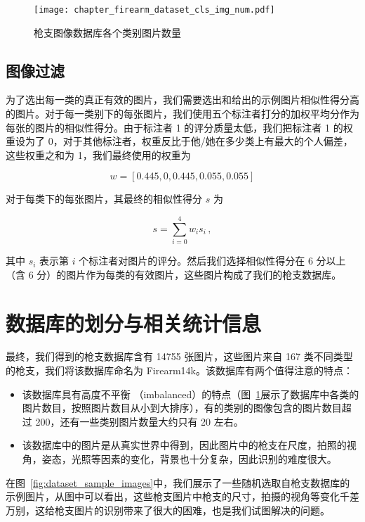 \begin{figure}[t]
	\centering
	\texttt{[image: chapter\_firearm\_dataset\_cls\_img\_num.pdf]}
	\caption{枪支图像数据库各个类别图片数量}
	\label{fig:dataset_cls_img_num}
\end{figure}

\subsection{图像过滤}
为了选出每一类的真正有效的图片，我们需要选出和给出的示例图片相似性得分高的图片。对于每一类别下的每张图片，我们使用五个标注者打分的加权平均分作为每张的图片的相似性得分。由于标注者 1 的评分质量太低，我们把标注者 1 的权重设为了 0，对于其他标注者，权重反比于他/她在多少类上有最大的个人偏差，这些权重之和为 1，我们最终使用的权重为

 \[w = [0.445, 0, 0.445, 0.055, 0.055]\]

对于每类下的每张图片，其最终的相似性得分 $s$ 为

\begin{equation}
s = \sum_{i=0}^{4}w_{i}s_{i}\, ,
\end{equation}

其中 $s_i$ 表示第 $i$ 个标注者对图片的评分。然后我们选择相似性得分在 6 分以上（含 6 分）的图片作为每类的有效图片，这些图片构成了我们的枪支数据库。

\section{数据库的划分与相关统计信息}\label{sec:dataset_stats}


最终，我们得到的枪支数据库含有 14755 张图片，这些图片来自 167 类不同类型的枪支，我们将该数据库命名为 Firearm14k。该数据库有两个值得注意的特点：
\begin{itemize}
\item  该数据库具有高度不平衡 （imbalanced）的特点（图~\ref{fig:dataset_cls_img_num}展示了数据库中各类的图片数目，按照图片数目从小到大排序），有的类别的图像包含的图片数目超过 200，还有一些类别图片数量大约只有 20 左右。
\item 该数据库中的图片是从真实世界中得到，因此图片中的枪支在尺度，拍照的视角，姿态，光照等因素的变化，背景也十分复杂，因此识别的难度很大。
\end{itemize}
在图~\ref{fig:dataset_sample_images}中，我们展示了一些随机选取自枪支数据库的示例图片，从图中可以看出，这些枪支图片中枪支的尺寸，拍摄的视角等变化千差万别，这给枪支图片的识别带来了很大的困难，也是我们试图解决的问题。

